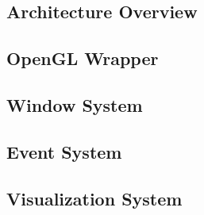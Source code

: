 \subsection{Architecture Overview}
\subsection{OpenGL Wrapper}
\subsection{Window System}
\subsection{Event System}
\subsection{Visualization System}
